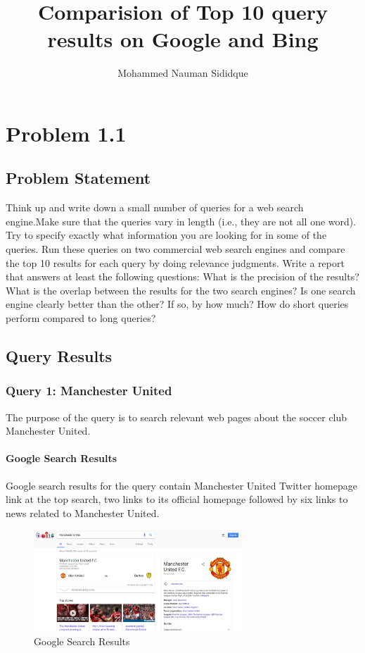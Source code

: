 \documentclass[12pt]{report}
\author{Mohammed Nauman Sididque}
\title{Comparision of Top 10 query results on Google and Bing }
\begin{document}
\maketitle
\tableofcontents

\chapter{Problem 1.1}
\section{Problem Statement}
Think up and write down a small number of queries for a web search engine.Make sure that the queries vary in length (i.e., they are not all one word). Try to specify exactly what information you are looking for in some of the queries. Run these queries on two commercial web search engines and compare the top 10 results for each query by doing relevance judgments. Write a report that answers at least the following questions: What is the precision of the results? What is the overlap between the results for the two search engines? Is one search engine clearly better than the other? If so, by how much? How do short queries perform compared to long queries?
\section{Query Results}

\subsection{Query 1: Manchester United}
The purpose of the query is to search relevant web pages about the soccer club Manchester United.
\subsubsection{Google Search Results}
Google search results for the query contain  Manchester United Twitter homepage link at the top search, two links to its official homepage followed by six links to news related to Manchester United.

\begin{figure}[ht]
  \centering
  \includegraphics[width=0.7\textwidth]{Query1_Google.PNG}
  \caption{Google Search Results}
  \label{fig:1}
\end{figure}
\end{document}
